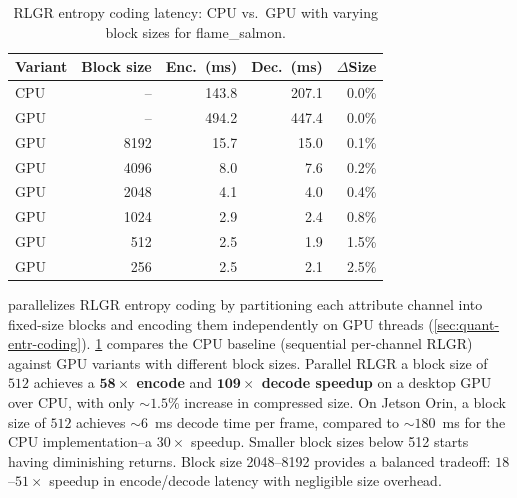 %
\begin{table}[t]
  \centering
  \begin{tabular}{l|rr|r|r}
    \hline
    \textbf{Variant} & \textbf{Block size} & \textbf{Enc.\ (ms)} & \textbf{Dec.\ (ms)} & \textbf{$\Delta$Size} \\
    \hline\hline
    CPU &  --   & 143.8  & 207.1 & 0.0\% \\
    GPU &  --   & 494.2  & 447.4 & 0.0\% \\
    GPU & 8192  & 15.7  & 15.0   & 0.1\% \\
    GPU & 4096  & 8.0   & 7.6    & 0.2\% \\
    GPU & 2048  & 4.1   & 4.0    & 0.4\% \\
    GPU & 1024  & 2.9   & 2.4    & 0.8\% \\
    GPU & 512   & 2.5   & 1.9    & 1.5\% \\
    GPU & 256   & 2.5   & 2.1    & 2.5\% \\
    \hline
  \end{tabular}
  \caption{RLGR entropy coding latency: CPU vs.\ GPU with varying block sizes for flame\_salmon.}
  \label{tab:ablation-rlgr}
\end{table}
%
\gsnfs{} parallelizes RLGR entropy coding by partitioning each attribute channel into fixed-size blocks and encoding them independently on GPU threads (\cref{sec:quant-entr-coding}).
%
\cref{tab:ablation-rlgr} compares the CPU baseline (sequential per-channel RLGR) against GPU variants with different block sizes.
%
Parallel RLGR a block size of $512$ achieves a \textbf{$\boldsymbol{58\times}$ encode} and \textbf{$\boldsymbol{109\times}$ decode speedup} on a desktop GPU over CPU, with only ${\sim}1.5$\% increase in compressed size.
%
On Jetson Orin, a block size of $512$ achieves ${\sim}6$~ms decode time per frame, compared to ${\sim}180$~ms for the CPU implementation--a $30\times$ speedup.
%
Smaller block sizes below 512 starts having diminishing returns.
%
Block size 2048--8192 provides a balanced tradeoff: $18$--$51\times$ speedup in encode/decode latency with negligible size overhead.

